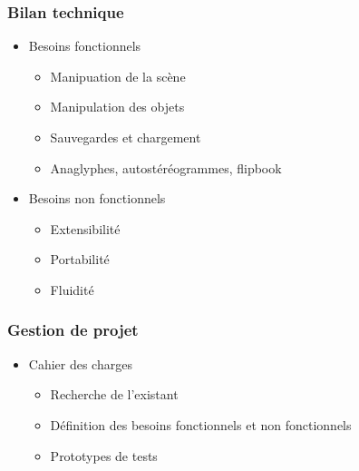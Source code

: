 \documentclass{beamer}
\begin{document}
\begin{frame}
\frametitle{Bilan technique}
\begin{itemize}[label=$\bullet$]
\item Besoins fonctionnels
	\begin{itemize}[label=$\circ$]
	\item Manipuation de la scène
	\item Manipulation des objets
	\item Sauvegardes et chargement
	\item Anaglyphes, autostéréogrammes, flipbook
	\end{itemize}
\item Besoins non fonctionnels
	\begin{itemize}[label=$\circ$]
	\item Extensibilité
	\item Portabilité
	\item Fluidité
	\end{itemize}
\end{itemize}
\end{frame}


\begin{frame}
\frametitle{Gestion de projet}
\begin{itemize}[label=$\bullet$]
\item Cahier des charges
	\begin{itemize}[label=$\circ$]
	\item Recherche de l'existant
	\item Définition des besoins fonctionnels et non fonctionnels
	\item Prototypes de tests
	\end{itemize}
\end{itemize}
\end{frame}

\end{document}
